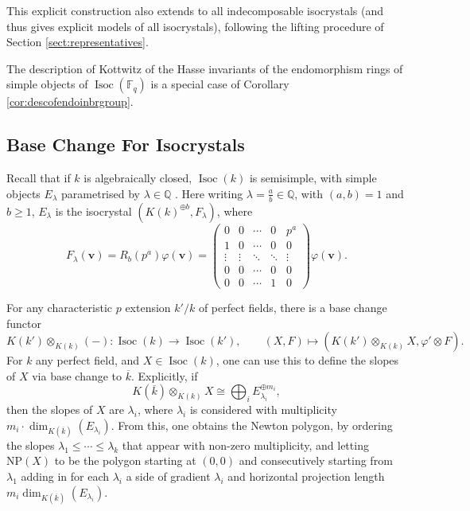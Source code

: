 \documentclass[10pt, reqno, hidelinks]{amsart}
\DeclareMathOperator{\Isoc}{Isoc}
\newcommand{\bF}{{\mathbb F}}
\newcommand{\bQ}{{\mathbb Q}}
\numberwithin{thm}{subsection}
\theoremstyle{definition}
\begin{document}
This explicit construction also extends to all indecomposable isocrystals (and thus gives explicit models of all isocrystals), following the lifting procedure of Section \ref{sect:representatives}.

The description of Kottwitz \cite[Lem.\ 11.2]{Kott} of the Hasse invariants of the endomorphism rings of simple objects of $\Isoc(\bF_q)$ is a special case of Corollary \ref{cor:descofendoinbrgroup}.

\subsection{Base Change For Isocrystals}\label{sect:basechangeisoc}

Recall that if $k$ is algebraically closed, $\Isoc(k)$ is semisimple, with simple objects $E_{\lambda}$ parametrised by $\lambda \in \bQ$ \cite{Manin}. Here writing $\lambda = \frac{a}{b} \in \bQ$, with $(a,b) = 1$ and $b \geq 1$, $E_{\lambda}$ is the isocrystal $(K(k)^{\oplus b}, F_{\lambda})$, where
\[
F_{\lambda}(\mathbf{v}) = R_b(p^a)\varphi(\mathbf{v}) = \begin{pmatrix}
    0 & 0 &\cdots & 0 & p^a \\
    1 & 0 & \cdots & 0 & 0 \\
    \vdots & \vdots & \ddots & \ddots & \vdots \\
    0 & 0 & \cdots & 0 & 0 \\
    0 & 0 & \cdots & 1 & 0
\end{pmatrix} \varphi(\mathbf{v}).
\]

For any characteristic $p$ extension $k' / k$ of perfect fields, there is a base change functor
\[
K(k') \otimes_{K(k)} (-) \colon \Isoc(k) \rightarrow \Isoc(k'), \qquad (X,F) \mapsto (K(k') \otimes_{K(k)} X, \varphi' \otimes F).
\]
For $k$ any perfect field, and $X \in \Isoc(k)$, one can use this to define the slopes of $X$ via base change to $\overline{k}$. Explicitly, if 
\[
K(\overline{k}) \otimes_{K(k)} X \cong \bigoplus_i E_{\lambda_i}^{\oplus m_i},
\]
then the slopes of $X$ are $\lambda_i$, where $\lambda_i$ is considered with multiplicity $m_i \cdot \dim_{K(\overline{k})}(E_{\lambda_i})$. From this, one obtains the Newton polygon, by ordering the slopes $\lambda_1 \leq \cdots \leq \lambda_k$ that appear with non-zero multiplicity, and letting $\text{NP}(X)$ to be the polygon starting at $(0,0)$ and consecutively starting from $\lambda_1$ adding in for each $\lambda_i$ a side of gradient $\lambda_i$ and horizontal projection length $m_i \dim_{K(\overline{k})}(E_{\lambda_i})$.
\end{document}
